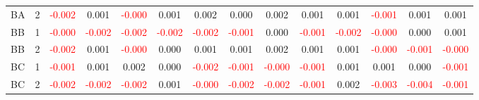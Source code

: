 \begin{table}[!htb]
{\begin{tabular}{llcccccccccccc}
BA & 2 & \textcolor{red}{-0.002} & 0.001 & \textcolor{red}{-0.000} & 0.001 & 0.002 & 0.000 & 0.002 & 0.001 & 0.001 & \textcolor{red}{-0.001} & 0.001 & 0.001\\
BB & 1 & \textcolor{red}{-0.000} & \textcolor{red}{-0.002} & \textcolor{red}{-0.002} & \textcolor{red}{-0.002} & \textcolor{red}{-0.002} & \textcolor{red}{-0.001} & 0.000 & \textcolor{red}{-0.001} & \textcolor{red}{-0.002} & \textcolor{red}{-0.000} & 0.000 & 0.001\\
BB & 2 & \textcolor{red}{-0.002} & 0.001 & \textcolor{red}{-0.000} & 0.000 & 0.001 & 0.001 & 0.002 & 0.001 & 0.001 & \textcolor{red}{-0.000} & \textcolor{red}{-0.001} & \textcolor{red}{-0.000}\\
BC & 1 & \textcolor{red}{-0.001} & 0.001 & 0.002 & 0.000 & \textcolor{red}{-0.002} & \textcolor{red}{-0.001} & \textcolor{red}{-0.000} & \textcolor{red}{-0.001} & 0.001 & 0.001 & 0.000 & \textcolor{red}{-0.001}\\
BC & 2 & \textcolor{red}{-0.002} & \textcolor{red}{-0.002} & \textcolor{red}{-0.002} & 0.001 & \textcolor{red}{-0.000} & \textcolor{red}{-0.002} & \textcolor{red}{-0.002} & \textcolor{red}{-0.001} & 0.002 & \textcolor{red}{-0.003} & \textcolor{red}{-0.004} & \textcolor{red}{-0.001}\\
\hline
    \end{tabular}%
    }
\end{table}
